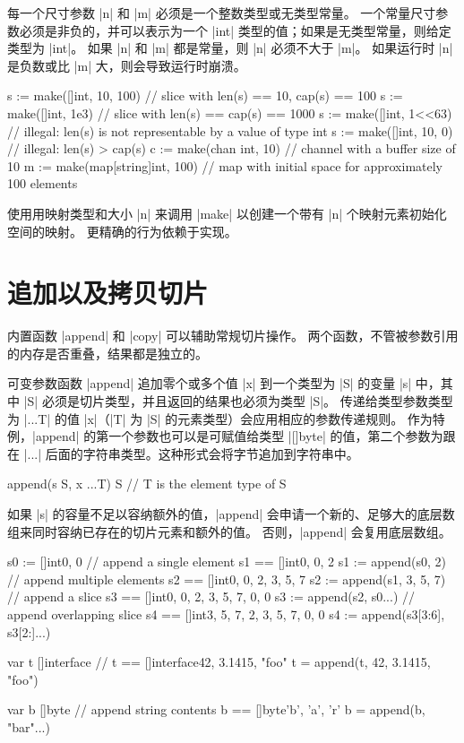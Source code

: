 每一个尺寸参数 \code|n| 和 \code|m| 必须是一个整数类型或无类型常量。
一个常量尺寸参数必须是非负的，并可以表示为一个 \code|int| 类型的值；如果是无类型常量，则给定类型为 \code|int|。
如果 \code|n| 和 \code|m| 都是常量，则 \code|n| 必须不大于 \code|m|。
如果运行时 \code|n| 是负数或比 \code|m| 大，则会导致运行时崩溃。
\begin{golang}
s := make([]int, 10, 100)       // slice with len(s) == 10, cap(s) == 100
s := make([]int, 1e3)           // slice with len(s) == cap(s) == 1000
s := make([]int, 1<<63)         // illegal: len(s) is not representable by a value of type int
s := make([]int, 10, 0)         // illegal: len(s) > cap(s)
c := make(chan int, 10)         // channel with a buffer size of 10
m := make(map[string]int, 100)  // map with initial space for approximately 100 elements
\end{golang}
使用用映射类型和大小 \code|n| 来调用 \code|make| 以创建一个带有 \code|n| 个映射元素初始化空间的映射。
更精确的行为依赖于实现。

\section{追加以及拷贝切片}
内置函数 \code|append| 和 \code|copy| 可以辅助常规切片操作。
两个函数，不管被参数引用的内存是否重叠，结果都是独立的。

可变参数函数 \code|append| 追加零个或多个值 \code|x| 到一个类型为 \code|S| 的变量 \code|s| 中，其中 \code|S| 必须是切片类型，并且返回的结果也必须为类型 \code|S|。
传递给类型参数类型为 \code|...T| 的值 \code|x|（\code|T| 为 \code|S| 的元素类型）会应用相应的参数传递规则。
作为特例，\code|append| 的第一个参数也可以是可赋值给类型 \code|[]byte| 的值，第二个参数为跟在 \code|...| 后面的字符串类型。这种形式会将字节追加到字符串中。
\begin{golang}
append(s S, x ...T) S  // T is the element type of S
\end{golang}

如果 \code|s| 的容量不足以容纳额外的值，\code|append| 会申请一个新的、足够大的底层数组来同时容纳已存在的切片元素和额外的值。
否则，\code|append| 会复用底层数组。
\begin{golang}
s0 := []int{0, 0}
// append a single element     s1 == []int{0, 0, 2}
s1 := append(s0, 2)
// append multiple elements    s2 == []int{0, 0, 2, 3, 5, 7}
s2 := append(s1, 3, 5, 7)
// append a slice              s3 == []int{0, 0, 2, 3, 5, 7, 0, 0}
s3 := append(s2, s0...)
// append overlapping slice    s4 == []int{3, 5, 7, 2, 3, 5, 7, 0, 0}
s4 := append(s3[3:6], s3[2:]...)

var t []interface{}
//                             t == []interface{}{42, 3.1415, "foo"}
t = append(t, 42, 3.1415, "foo")   

var b []byte
// append string contents      b == []byte{'b', 'a', 'r' }
b = append(b, "bar"...)            
\end{golang}

